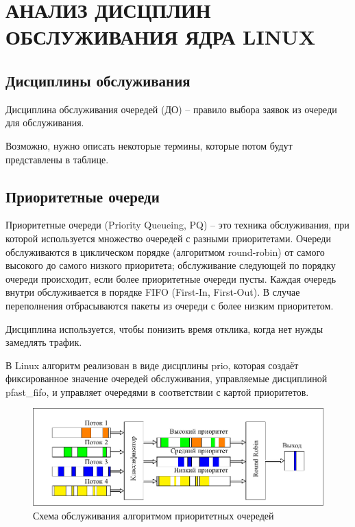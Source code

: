 \section{АНАЛИЗ ДИСЦПЛИН ОБСЛУЖИВАНИЯ ЯДРА LINUX}

    \subsection{Дисциплины обслуживания}


	Дисциплина обслуживания очередей (ДО) -- правило выбора заявок
	из очереди для обслуживания\cite{Aliev}.

	Возможно, нужно описать некоторые термины, которые потом будут представлены в таблице.

    \subsection{Приоритетные очереди}

    Приоритетные очереди (Priority Queueing, PQ) -- это техника обслуживания,
    при которой используется множество очередей с разными приоритетами. Очереди
    обслуживаются в циклическом порядке (алгоритмом round-robin) от самого высокого 
    до самого низкого приоритета; обслуживание следующей по порядку очереди происходит,
    если более приоритетные очереди пусты. Каждая очередь внутри обслуживается в порядке FIFO
    (First-In, First-Out). В случае переполнения отбрасываются пакеты из очереди
    с более низким приоритетом.\cite{packethandling}
    
    Дисциплина используется, чтобы понизить время отклика, когда нет нужды замедлять трафик\cite{tcprio}. 

    В Linux алгоритм реализован в виде дисцплины prio, которая создаёт фиксированное
    значение очередей обслуживания, управляемые дисциплиной pfast\_fifo, и управляет
    очередями в соответствии с картой приоритетов.\cite{tcprio}

    \begin{figure}[ht!]
        \center
        \includegraphics{pdfimages/pq.pdf}
        \caption{Схема обслуживания алгоритмом приоритетных очередей}
    \end{figure}

